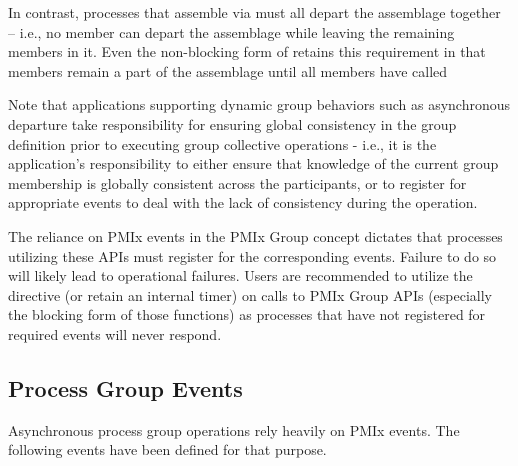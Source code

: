 In contrast, processes that assemble via  must all depart the assemblage together – i.e., no member can depart the assemblage while leaving the remaining members in it. Even the non-blocking form of  retains this requirement in that members remain a part of the assemblage until all members have called 

Note that applications supporting dynamic group behaviors such as asynchronous departure take responsibility for ensuring global consistency in the group definition prior to executing group collective operations - i.e., it is the application's responsibility to either ensure that knowledge of the current group membership is globally consistent across the participants, or to register for appropriate events to deal with the lack of consistency during the operation.

\adviceuserstart
The reliance on \ac{PMIx} events in the \ac{PMIx} Group concept dictates that processes utilizing these \acp{API} must register for the corresponding events. Failure to do so will likely lead to operational failures. Users are recommended to utilize the  directive (or retain an internal timer) on calls to \ac{PMIx} Group \acp{API} (especially the blocking form of those functions) as processes that have not registered for required events will never respond.
\adviceuserend

\subsection{Process Group Events}

Asynchronous process group operations rely heavily on \ac{PMIx} events.  The following events have been defined for that purpose.


